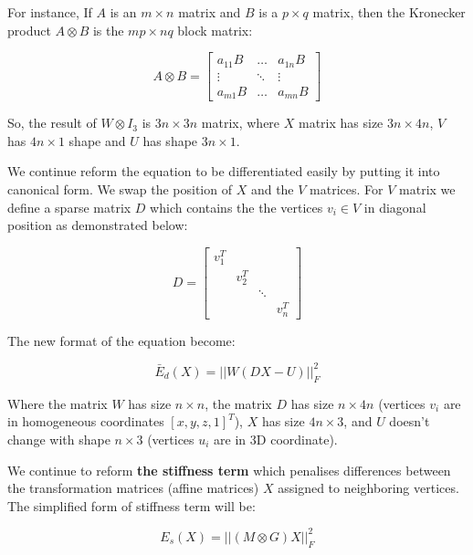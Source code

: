 \documentclass[../structure.tex]{subfiles}
\begin{document}
For instance, If $A$ is an $m \times n$ matrix and $B$ is a $p \times q$ matrix, then the Kronecker product $A \otimes B$ is the $mp \times nq$ block matrix:

\begin{equation*}
A \otimes B = 
\begin{bmatrix}
a_{11}B & \dots  & a_{1n}B \\
\vdots  & \ddots & \vdots  \\
a_{m1}B & \dots  & a_{mn}B
\end{bmatrix}
\end{equation*}

So, the result of $W \otimes I_{3}$ is $3n\times 3n$ matrix, where $X$ matrix has size $3n\times4n$, $V$ has $4n\times1$ shape and $U$ has shape $3n\times1$.

We continue reform the equation to be differentiated easily by putting it into canonical form. We swap the position of $X$ and the $V$ matrices. For $V$ matrix we define a sparse matrix $D$ which contains the the vertices $v_{i} \in V$ in diagonal position as demonstrated below:
 
\begin{equation}
D = 
\begin{bmatrix}
v_{1}^T & & & \\
 & v_{2}^T & & \\
 & & \ddots & \\
 & & & v_{n}^T 
\end{bmatrix}
\end{equation} 

The new format of the equation become:

\begin{equation}
\bar{E}_{d}(X) = ||W(DX-U)||_{F}^2
\end{equation}

Where the matrix $W$ has size $n\times n$, the matrix $D$ has size $n\times 4n$ (vertices $v_{i}$ are in homogeneous coordinates $[x,y,z,1]^T$), $X$ has size $4n\times 3$, and $U$ doesn't change with shape $n\times 3$ (vertices $u_{i}$ are in 3D coordinate).

We continue to reform \textbf{the stiffness term} which penalises differences between the transformation matrices (affine matrices) $X$ assigned to neighboring vertices. The simplified form of stiffness term will be:

\begin{equation}
E_{s}(X) = ||(M\otimes G)X||_{F}^2
\end{equation}
\end{document}

